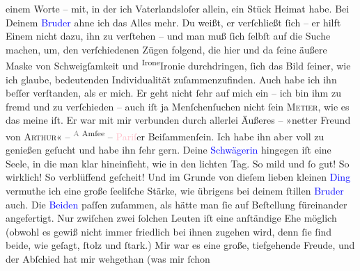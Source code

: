               einem Worte – mit, in der ich Vaterlandsloſer allein, \strikeout{\textcolor{gray}{man}} ein Stück Heimat habe. Bei Deinem \textcolor{blue}{Bruder}{} ahne ich das Alles mehr.
               Du weißt, er verſchließt ſich – er hilft Einem nicht dazu, ihn zu verſtehen – und man
               muß ſich ſelbſt auf die Suche machen, um, den verſchiedenen Zügen folgend, die hier
               und da ſeine äußere Maske von Schweigſamkeit und \substVorne{}\textsuperscript{Irone}\substDazwischen{}Ironie\substHinten{} durchdringen, ſich {\pb}das Bild ſeiner, wie
               ich glaube, bedeutenden Individualität zuſammenzufinden. Auch habe ich ihn beſſer
               verſtanden, als er mich. Er geht nicht ſehr auf mich ein – ich bin ihm zu fremd und
               zu verſchieden – auch iſt ja Menſchenſuchen nicht ſein \textsc{Metier}, wie es das meine iſt. Er war mit mir verbunden durch allerlei
               Äußeres – »netter Freund von \textsc{Arthur}« – \substVorne{}\textsuperscript{\textcolor{gray}{A} Amſee}{\allowbreak}\substDazwischen{}\textcolor{pink}{\textsc{\label{K_L02608-1v}\label{K_L02608-1h}}}{}\ledrightnote{\textcolor{pink}{Almsee}}\substHinten{} – \textcolor{pink}{Pariſ}{}\ledrightnote{\textcolor{pink}{Paris}}er Beiſammenſein. Ich habe ihn aber
               voll zu genießen geſucht und habe ihn ſehr gern. Deine \textcolor{blue}{Schwägerin}{} hingegen iſt eine Seele, in die man klar
               hineinſieht, wie in den lichten Tag. So mild {\pb}und ſo
               gut! So wirklich! So verblüffend geſcheit! Und im Grunde von dieſem lieben kleinen
                  \textcolor{blue}{Ding}{} vermuthe ich eine große
               ſeeliſche Stärke, wie übrigens bei deinem ſtillen \textcolor{blue}{Bruder}{} auch. Die \textcolor{blue}{Beiden}{} paſſen zuſammen, als hätte man ſie auf Beſtellung
               füreinander angefertigt. Nur zwiſchen zwei ſolchen Leuten iſt eine anſtändige Ehe
               möglich (obwohl es gewiß nicht immer friedlich bei ihnen zugehen wird, denn ſie ſind
               beide, wie geſagt, ſtolz und ſtark.) {\pb}Mir war es
               eine große, tiefgehende Freude, und der Abſchied hat mir wehgethan (was mir ſchon
